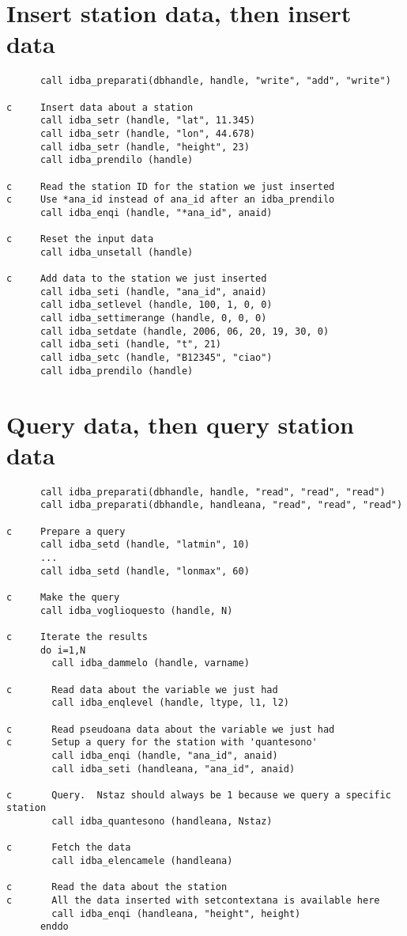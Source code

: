 \documentclass[final,12pt,a4paper,twoside]{book}
\begin{document}

\section{Insert station data, then insert data}

\begin{verbatim}
      call idba_preparati(dbhandle, handle, "write", "add", "write")
      
c     Insert data about a station
      call idba_setr (handle, "lat", 11.345)
      call idba_setr (handle, "lon", 44.678)
      call idba_setr (handle, "height", 23)
      call idba_prendilo (handle)

c     Read the station ID for the station we just inserted
c     Use *ana_id instead of ana_id after an idba_prendilo
      call idba_enqi (handle, "*ana_id", anaid)

c     Reset the input data
      call idba_unsetall (handle)

c     Add data to the station we just inserted
      call idba_seti (handle, "ana_id", anaid)
      call idba_setlevel (handle, 100, 1, 0, 0)
      call idba_settimerange (handle, 0, 0, 0)
      call idba_setdate (handle, 2006, 06, 20, 19, 30, 0)
      call idba_seti (handle, "t", 21)
      call idba_setc (handle, "B12345", "ciao")
      call idba_prendilo (handle)
\end{verbatim}


\section{Query data, then query station data}

\begin{verbatim}
      call idba_preparati(dbhandle, handle, "read", "read", "read")
      call idba_preparati(dbhandle, handleana, "read", "read", "read")
      
c     Prepare a query
      call idba_setd (handle, "latmin", 10)
      ...
      call idba_setd (handle, "lonmax", 60)

c     Make the query
      call idba_voglioquesto (handle, N)

c     Iterate the results
      do i=1,N
        call idba_dammelo (handle, varname)

c       Read data about the variable we just had
        call idba_enqlevel (handle, ltype, l1, l2)

c       Read pseudoana data about the variable we just had
c       Setup a query for the station with 'quantesono'
        call idba_enqi (handle, "ana_id", anaid)
        call idba_seti (handleana, "ana_id", anaid)

c       Query.  Nstaz should always be 1 because we query a specific station
        call idba_quantesono (handleana, Nstaz)

c       Fetch the data
        call idba_elencamele (handleana)

c       Read the data about the station
c       All the data inserted with setcontextana is available here
        call idba_enqi (handleana, "height", height)
      enddo
\end{verbatim}
\end{document}
